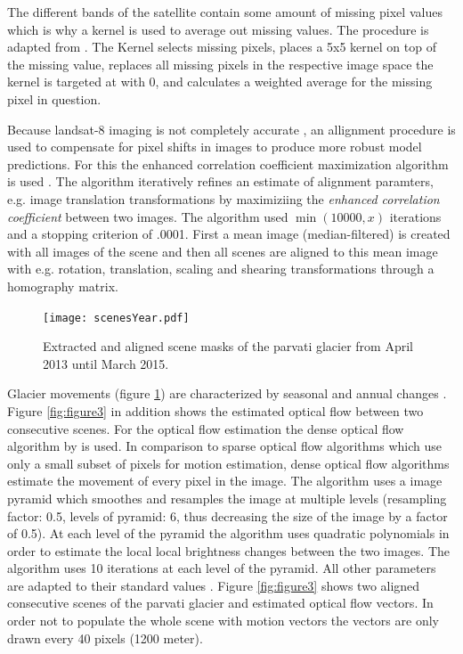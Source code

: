 \documentclass[12pt]{article}
\begin{document}
 The different bands of the satellite contain some amount of missing pixel values which is why a kernel is used to average out missing values. The procedure is adapted from \citet{vonica2021glacier}. The Kernel selects missing pixels, places a 5x5 kernel on top of the missing value, replaces all missing pixels in the respective image space the kernel is targeted at with 0, and calculates a weighted average for the missing pixel in question.
 
Because landsat-8 imaging is not completely accurate \citep{vonica2021glacier}, an allignment procedure is used to compensate for pixel shifts in images to produce more robust model predictions. For this the enhanced correlation coefficient maximization algorithm is used \citep{evangelidis2008parametric}. The algorithm iteratively refines an estimate of alignment paramters, e.g. image translation transformations by maximiziing the \textit{enhanced correlation coefficient} between two images. The algorithm used $\min(10000,x)$ iterations and a stopping criterion of .0001. First a mean image (median-filtered) is created with all images of the scene and then all scenes are aligned to this mean image with e.g. rotation, translation, scaling and shearing transformations through a homography matrix. 

\begin{figure}[H]
	
	\centering
	\texttt{[image: scenesYear.pdf]}\hfill
	
	\caption{Extracted and aligned scene masks of the parvati glacier from April 2013 until March 2015.}
	\label{figure4}
	
\end{figure} 
 
Glacier movements (figure \ref{figure4}) are characterized by seasonal and annual changes \citet{sam2018heterogeneity}. Figure \ref{fig:figure3} in addition shows the estimated optical flow between two consecutive scenes. For the optical flow estimation the dense optical flow algorithm by \citet{farneback2003two} is used. In comparison to sparse optical flow algorithms which use only a small subset of pixels for motion estimation, dense optical flow algorithms estimate the movement of every pixel in the image. The algorithm uses a image pyramid which smoothes and resamples the image at multiple levels (resampling factor: 0.5, levels of pyramid: 6, thus decreasing the size of the image by a factor of 0.5). At each level of the pyramid the algorithm uses quadratic polynomials in order to estimate the local local brightness changes between the two images. The algorithm uses 10 iterations at each level of the pyramid. All other parameters are adapted to their standard values \citep{vonica2021glacier}. Figure \ref{fig:figure3} shows two aligned consecutive scenes of the parvati glacier and estimated optical flow vectors. In order not to populate the whole scene with motion vectors the vectors are only drawn every 40 pixels (1200 meter).
 
\end{document}
